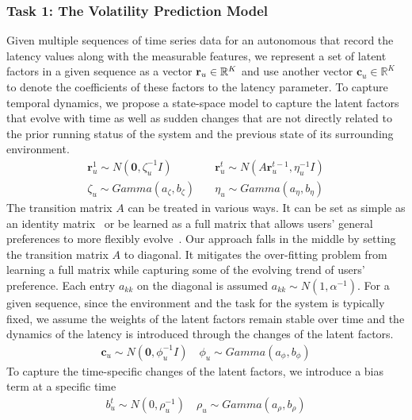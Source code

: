 \documentclass[12pt]{article}
\begin{document}
\vspace{-2mm}
\subsubsection{Task 1: The Volatility Prediction Model} \vspace{-2mm}
Given multiple sequences of time series data for an autonomous that record the latency values along with the measurable features, we represent a set of latent factors in a given sequence as a vector ${\bf r}_u\in\mathbb{R}^K$ and use another vector  $\boldsymbol{c}_u\in\mathbb{R}^K$ to denote the coefficients of these factors to the latency parameter. To capture temporal dynamics, we propose a state-space model to capture the latent factors that evolve with time as well as sudden changes that are not directly related to the prior running status of the system and the previous state of its surrounding environment. 
\begin{align}
\nonumber\boldsymbol{r}_u^1\sim N(\boldsymbol{0},\zeta_u^{-1}I)\quad
& \boldsymbol{r}_u^t\sim N(A\boldsymbol{r}_u^{t-1},\eta_u^{-1}I) \\
\nonumber\zeta_u\sim Gamma(a_{\zeta},b_{\zeta})\quad
& \eta_u\sim Gamma(a_{\eta},b_{\eta})
\end{align}
The transition matrix $A$ can be treated in various ways. It can be set as simple as an identity matrix~\cite{Charlin2015dpf} or be learned as a full matrix that allows users' general preferences to more flexibly evolve~\cite{Sun2014}. Our approach falls in the middle by setting the transition matrix $A$ to diagonal. It mitigates the over-fitting problem from learning a full matrix while capturing some of the evolving trend of users' preference. Each entry $a_{kk}$ on the diagonal is assumed $ a_{kk}\sim N(1,\alpha^{-1}) $. For a given sequence, since the environment and the task for the system is typically fixed, we assume the weights of the latent factors remain stable over time and the dynamics of the latency is introduced through the changes of the latent factors. 
\begin{align}
\nonumber\boldsymbol{c}_u\sim N(\boldsymbol{0},\phi_u^{-1}I)\quad\phi_u\sim Gamma(a_{\phi},b_{\phi})
\end{align}
 To capture the time-specific changes of the latent factors, we introduce a bias term at a specific time
\begin{align}
\nonumber b_u^t\sim N(0,\rho_u^{-1})\quad\rho_u\sim Gamma(a_{\rho},b_{\rho})
\end{align}
\end{document}
